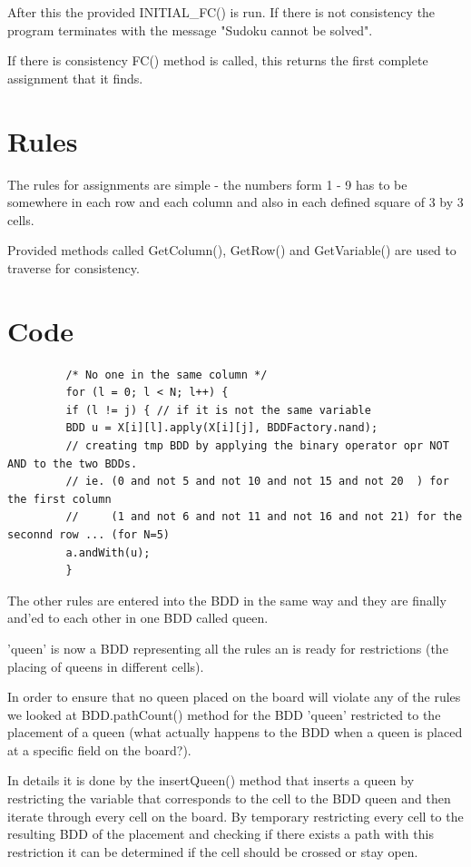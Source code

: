 After this the provided INITIAL\_FC() is run. If there is not consistency the program terminates with the message "Sudoku cannot be solved". 

If there is consistency FC() method is called, this returns the first complete assignment that it finds. 


\section{Rules}


The rules for assignments are simple - the numbers form 1 - 9 has to be somewhere in each row and each column and also in each defined square of 3 by 3 cells.

Provided methods called GetColumn(), GetRow() and GetVariable() are used to traverse for consistency.

\section{Code}



\begin{lstlisting}
         /* No one in the same column */
         for (l = 0; l < N; l++) {
         if (l != j) { // if it is not the same variable
         BDD u = X[i][l].apply(X[i][j], BDDFactory.nand); 
         // creating tmp BDD by applying the binary operator opr NOT AND to the two BDDs.
         // ie. (0 and not 5 and not 10 and not 15 and not 20  ) for the first column
         //     (1 and not 6 and not 11 and not 16 and not 21) for the seconnd row ... (for N=5)
         a.andWith(u);
         }
\end{lstlisting}

The other rules are entered into the BDD in the same way and they are finally and'ed to each other in one BDD called queen.

'queen' is now a BDD representing all the rules an is ready for restrictions (the placing of queens in different cells).

In order to ensure that no queen placed on the board will violate any of the rules we looked at BDD.pathCount() method for the BDD 'queen' restricted to the placement of a queen (what actually happens to the BDD when a queen is placed at a specific field on the board?). 

In details it is done by the insertQueen() method that inserts a queen by restricting the variable that corresponds to the cell to the BDD queen and then iterate through every cell on the board. By temporary restricting every cell to the resulting BDD of the placement and checking if there exists a path with this restriction it can be determined if the cell should be crossed or stay open.


